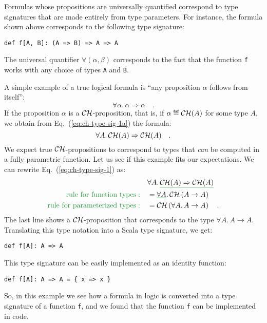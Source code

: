 Formulas whose propositions are universally quantified correspond
to type signatures that are made entirely from type parameters. For
instance, the formula shown above corresponds to the following type
signature:
\begin{lstlisting}
def f[A, B]: (A => B) => A => A
\end{lstlisting}
The universal quantifier $\forall(\alpha,\beta)$ corresponds to the
fact that the function \lstinline!f! works with any choice of types
\lstinline!A! and \lstinline!B!.

A simple example of a true logical formula is \textsf{``}any proposition $\alpha$
follows from itself\textsf{''}:
\begin{equation}
\forall\alpha.\,\alpha\Rightarrow\alpha\quad.\label{eq:ch-type-sig-1a}
\end{equation}
If the proposition $\alpha$ is a ${\cal CH}$-proposition, that is,
if $\alpha\triangleq{\cal CH}(A)$ for some type $A$, we obtain from
Eq.~(\ref{eq:ch-type-sig-1a}) the formula:
\begin{equation}
\forall A.\,{\cal CH}(A)\Rightarrow{\cal CH}(A)\quad.\label{eq:ch-type-sig-1}
\end{equation}
We expect true ${\cal CH}$-propositions to correspond to types that
\emph{can} be computed in a fully parametric function. Let us see
if this example fits our expectations. We can rewrite Eq.~(\ref{eq:ch-type-sig-1})
as:
\begin{align*}
 & \forall A.\,\gunderline{{\cal CH}(A)\Rightarrow{\cal CH}(A)}\\
{\color{greenunder}\text{rule for function types}:}\quad & =\gunderline{\forall A}.\,{\cal CH}\left(A\rightarrow A\right)\\
{\color{greenunder}\text{rule for parameterized types}:}\quad & ={\cal CH}\left(\forall A.\,A\rightarrow A\right)\quad.
\end{align*}
The last line shows a ${\cal CH}$-proposition that corresponds to
the type $\forall A.\,A\rightarrow A$. Translating this type notation
into a Scala type signature, we get:
\begin{lstlisting}
def f[A]: A => A
\end{lstlisting}
This type signature can be easily implemented as an identity function:
\begin{lstlisting}
def f[A]: A => A = { x => x }
\end{lstlisting}
So, in this example we see how a formula in logic is converted into
a type signature of a function \lstinline!f!, and we found that the
function \lstinline!f! can be implemented in code.

